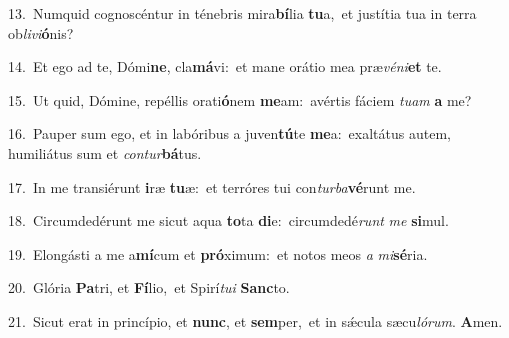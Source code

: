 {\numbfont\textcolor{\numbcolor}{13.}}~Numquid cognoscéntur in ténebris mira\-\textbf{bí}\-lia \textbf{tu}\-a,~\star et justítia tua in terra ob\-\textit{li}\-\textit{vi}\textbf{ó}nis?\par
{\numbfont\textcolor{\numbcolor}{14.}}~Et ego ad te, Dómi\-\textbf{ne}\-, cla\-\textbf{má}\-vi:~\star et mane orátio mea præ\-\textit{vé}\-\textit{ni}\textbf{et} te.\par
{\numbfont\textcolor{\numbcolor}{15.}}~Ut quid, Dómine, repéllis orati\-\textbf{ó}\-nem \textbf{me}\-am:~\star avértis fáciem \textit{tu}\-\textit{am} \textbf{a} me?\par
{\numbfont\textcolor{\numbcolor}{16.}}~Pauper sum ego, et in labóribus a juven\-\textbf{tú}\-te \textbf{me}\-a:~\star exaltátus autem, humiliátus sum et \textit{con}\-\textit{tur}\textbf{bá}tus.\par
{\numbfont\textcolor{\numbcolor}{17.}}~In me transiérunt \textbf{i}\-ræ \textbf{tu}\-æ:~\star et terróres tui con\-\textit{tur}\-\textit{ba}\textbf{vé}runt me.\par
{\numbfont\textcolor{\numbcolor}{18.}}~Circumdedérunt me sicut aqua \textbf{to}\-ta \textbf{di}\-e:~\star circumdedé\textit{runt} \textit{me} \textbf{si}\-mul.\par
{\numbfont\textcolor{\numbcolor}{19.}}~Elongásti a me a\-\textbf{mí}\-cum et \textbf{pró}\-ximum:~\star et notos meos \textit{a} \textit{mi}\-\textbf{sé}ria.\par
{\numbfont\textcolor{\numbcolor}{20.}}~Glória \textbf{Pa}\-tri, et \textbf{Fí}\-lio,~\star et Spirí\-\textit{tu}\-\textit{i} \textbf{Sanc}\-to.\par
{\numbfont\textcolor{\numbcolor}{21.}}~Sicut erat in princípio, et \textbf{nunc}\-, et \textbf{sem}\-per,~\star et in sǽcula sæcu\-\textit{ló}\-\textit{rum}. \textbf{A}\-men.\par
